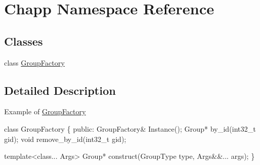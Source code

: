 \hypertarget{namespace_chapp}{}\section{Chapp Namespace Reference}
\label{namespace_chapp}
\subsection*{Classes}
\begin{DoxyCompactItemize}
\item 
class \hyperlink{class_chapp_1_1_group_factory}{Group\+Factory}
\end{DoxyCompactItemize}


\subsection{Detailed Description}
Example of \hyperlink{class_chapp_1_1_group_factory}{Group\+Factory}


\begin{DoxyCode}
\textcolor{keyword}{class }GroupFactory \{
\textcolor{keyword}{public}:
  GroupFactory& Instance();
  Group* by\_id(int32\_t gid);
  \textcolor{keywordtype}{void} remove\_by\_id(int32\_t gid);

  \textcolor{keyword}{template}<\textcolor{keyword}{class}... Args>
  Group* construct(GroupType type, Args&&... args);
\}
\end{DoxyCode}
 